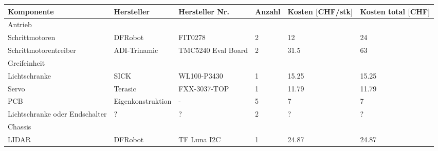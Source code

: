 \documentclass[main.tex]{subfiles} %
\begin{document}
\begin{table}[h]
    \centering
    \scriptsize %
    \begin{tabular}{|p{3cm}|p{3cm}|p{3cm}|p{1cm}|p{1.5cm}|p{1cm}|}
        \hline
        \textbf{Komponente}                    & \textbf{Hersteller} & \textbf{Hersteller Nr.} & \textbf{Anzahl} & \textbf{Kosten [CHF/stk]} & \textbf{Kosten total [CHF]} \\ \hline
        \rowcolor{lightgray} Antrieb           &                     &                         &                 &                           &                             \\ \hline
        Schrittmotoren                         & DFRobot             & FIT0278                 & 2               & 12                        & 24                          \\ \hline
        Schrittmotorentreiber                  & ADI-Trinamic        & TMC5240 Eval Board      & 2               & 31.5                      & 63                          \\ \hline
        \rowcolor{lightgray} Greifeinheit      &                     &                         &                 &                           &                             \\ \hline
        Lichtschranke                          & SICK                & WL100-P3430             & 1               & 15.25                     & 15.25                       \\ \hline
        Servo                                  & Terasic             & FXX-3037-TOP            & 1               & 11.79                     & 11.79                       \\ \hline
        PCB                                    & Eigenkonstruktion   & -                       & 5               & 7                         & 7                           \\ \hline
        Lichtschranke oder Endschalter         & ?                   & ?                       & 2               & ?                         & ?                           \\ \hline
        \rowcolor{lightgray} Chassis           &                     &                         &                 &                           &                             \\ \hline
        LIDAR                                  & DFRobot             & TF Luna I2C             & 1               & 24.87                     & 24.87                       \\ \hline

\end{tabular}
\end{table}
\end{document}
